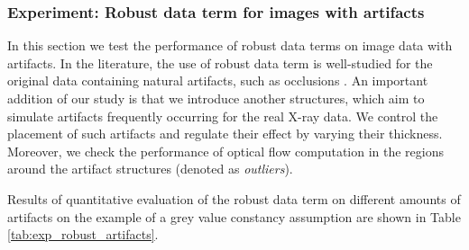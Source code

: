 	

\subsubsection{Experiment: Robust data term for images with artifacts}
\label{experiment_robust_data_term_artifacts}


In this section we test the performance of robust data terms on image data with artifacts. In the literature, the use of robust data term is well-studied for the original data containing natural artifacts, such as occlusions  \cite{Black96, Sun10, Middl, HarmonyFlow}.
An important addition of our study is that we introduce another structures, which aim to simulate artifacts frequently occurring for the real X-ray data. We control the placement of such artifacts and  regulate their effect by varying their thickness. Moreover, we check the performance of optical flow computation in the regions around the artifact structures (denoted as \textit{outliers}). 


Results of quantitative evaluation of the robust data term on different amounts of artifacts on the example of a grey value constancy assumption are shown in Table \ref{tab:exp_robust_artifacts}.



